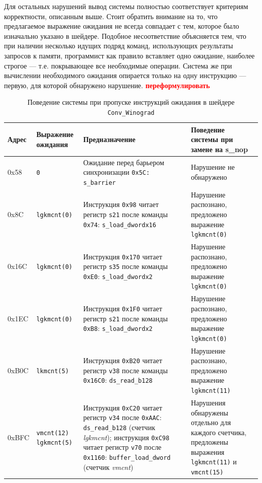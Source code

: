 \documentclass[a4paper,14pt]{extarticle}
\newcommand{\todo}[1]{\textbf{\textcolor{red}{#1}}}
\begin{document}
{Для остальных нарушений вывод системы полностью соответствует критериям корректности, описанным
выше. Стоит обратить внимание на то, что предлагаемое выражение ожидания не всегда совпадает
с тем, которое было изначально указано в шейдере. Подобное несоответствие объясняется тем,
что при наличии несколько идущих подряд команд, использующих результаты запросов к памяти,
программист как правило вставляет одно ожидание, наиболее строгое — т.е. покрывающее все
необходимые операции. Система же при вычислении необходимого ожидания опирается только
на одну инструкцию — первую, для которой обнаружено нарушение. \todo{переформулировать}

\begin{table}[H]
  \caption{Поведение системы при пропуске инструкций ожидания в шейдере \texttt{Conv\_Winograd}}
\label{table:test-waitcnt-winograd}
\begin{tabular}{|l|p{2.8cm}|p{6.5cm}|p{5cm}|}
\hline
\textbf{Адрес} & \textbf{Выражение ожидания} & \textbf{Предназначение} & \textbf{Поведение системы при замене на s\_nop} \\\hline
0x58 & \verb|0|
  & Ожидание перед барьером синхронизации \texttt{0x5C: s\_barrier}
  & Нарушение не обнаружено \\\hline
0x8C & \verb|lgkmcnt(0)|
  & Инструкция \verb|0x98| читает регистр \verb|s21| после команды \verb|0x74|: \verb|s_load_dwordx16|
  & Нарушение распознано, предложено выражение \verb|lgkmcnt(0)| \\\hline
0x16C & \verb|lgkmcnt(0)|
  & Инструкция \verb|0x170| читает регистр \verb|s35| после команды \verb|0xE0|: \verb|s_load_dwordx2|
  & Нарушение распознано, предложено выражение \verb|lgkmcnt(0)| \\\hline
0x1EC & \verb|lgkmcnt(0)|
  & Инструкция \verb|0x1F0| читает регистр \verb|s21| после команды \verb|0xB8|: \verb|s_load_dwordx2|
  & Нарушение распознано, предложено выражение \verb|lgkmcnt(0)| \\\hline
0xB0C & \verb|lkmcnt(5)|
  & Инструкция \verb|0xB20| читает регистр \verb|v38| после команды \verb|0x16C0|: \verb|ds_read_b128|
  & Нарушение распознано, предложено выражение \verb|lgkmcnt(11)| \\\hline
0xBFC & \verb|vmcnt(12)| \verb|lgkmcnt(5)|
  & Инструкция \verb|0xC20| читает регистр \verb|v34| после \verb|0xAAC|: \verb|ds_read_b128| (счетчик \textit{lgkmcnt});
  инструкция \verb|0xC98| читает регистр \verb|v70| после \verb|0x1160|: \verb|buffer_load_dword| (счетчик \textit{vmcnt})
  & Нарушения обнаружены отдельно для каждого счетчика, предложены выражения \verb|lgkmcnt(11)| и \verb|vmcnt(15)| \\\hline 

\end{tabular}
\end{table}}
\end{document}
